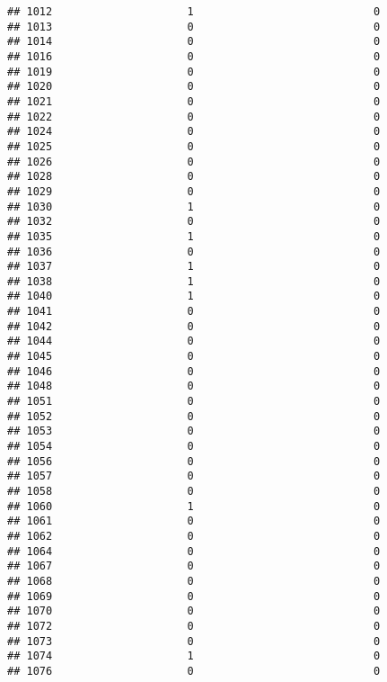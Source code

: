 \documentclass[
]{article}
\begin{document}
\begin{verbatim}
## 1012                     1                            0
## 1013                     0                            0
## 1014                     0                            0
## 1016                     0                            0
## 1019                     0                            0
## 1020                     0                            0
## 1021                     0                            0
## 1022                     0                            0
## 1024                     0                            0
## 1025                     0                            0
## 1026                     0                            0
## 1028                     0                            0
## 1029                     0                            0
## 1030                     1                            0
## 1032                     0                            0
## 1035                     1                            0
## 1036                     0                            0
## 1037                     1                            0
## 1038                     1                            0
## 1040                     1                            0
## 1041                     0                            0
## 1042                     0                            0
## 1044                     0                            0
## 1045                     0                            0
## 1046                     0                            0
## 1048                     0                            0
## 1051                     0                            0
## 1052                     0                            0
## 1053                     0                            0
## 1054                     0                            0
## 1056                     0                            0
## 1057                     0                            0
## 1058                     0                            0
## 1060                     1                            0
## 1061                     0                            0
## 1062                     0                            0
## 1064                     0                            0
## 1067                     0                            0
## 1068                     0                            0
## 1069                     0                            0
## 1070                     0                            0
## 1072                     0                            0
## 1073                     0                            0
## 1074                     1                            0
## 1076                     0                            0

\end{verbatim}
\end{document}
